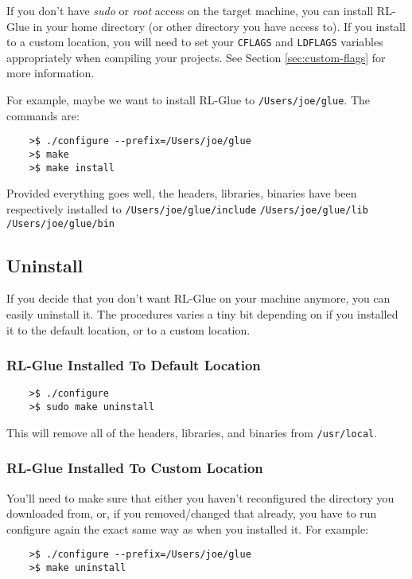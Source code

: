 \documentclass[11pt]{article}
\begin{document}
If you don't have \textit{sudo} or \textit{root} access on the target machine, you can install RL-Glue in your home directory (or other directory you have access to).
If you install to a custom location, you will need to set your \texttt{CFLAGS} and \texttt{LDFLAGS} variables appropriately when compiling your projects. See Section \ref{sec:custom-flags} for more information.

For example, maybe we want to install RL-Glue to \texttt{/Users/joe/glue}.  The commands are:
\begin{verbatim}
	>$ ./configure --prefix=/Users/joe/glue
	>$ make
	>$ make install
\end{verbatim}

Provided everything goes well, the headers, libraries, binaries have been respectively installed to\newline
\texttt{/Users/joe/glue/include}\newline
\texttt{/Users/joe/glue/lib}\newline
\texttt{/Users/joe/glue/bin}


\subsection{Uninstall}
If you decide that you don't want  RL-Glue on your machine anymore, you can easily uninstall it.  The procedures varies a tiny bit depending on if you installed it to the default location, or to a custom location.

\subsubsection{RL-Glue Installed To Default Location}
\begin{verbatim}
	>$ ./configure
	>$ sudo make uninstall
\end{verbatim}

This will remove all of the headers, libraries, and binaries from \texttt{/usr/local}.

\subsubsection{RL-Glue Installed To Custom Location}
You'll need to make sure that either you haven't reconfigured the directory you downloaded from, or, if you removed/changed that already, you have to run configure again the exact same way as when you installed it.  For example:
\begin{verbatim}
	>$ ./configure --prefix=/Users/joe/glue
	>$ make uninstall
\end{verbatim}
\end{document}
